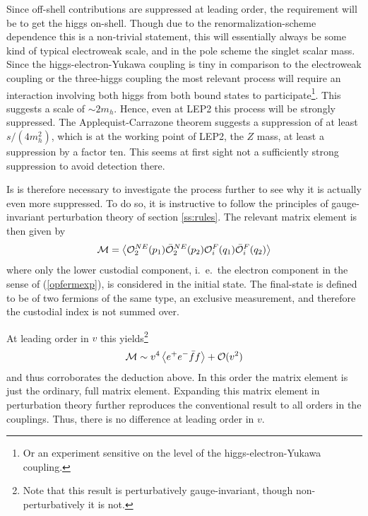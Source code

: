 \documentclass[final,12pt]{article}
\newcommand*{\no}{\noindent}
\newcommand*{\be}{\begin{equation}}
\newcommand*{\ee}{\end{equation}}
\newcommand*{\pref}[1]{(\ref{#1})}
\newcommand*{\1}{1\!\!\!\bot}
\newcommand*{\la}{\left\langle}
\newcommand*{\ra}{\right\rangle}
\newcommand*{\op}{{\cal O}}
\begin{document}
Since off-shell contributions are suppressed at leading order, the requirement will be to get the higgs on-shell. Though due to the renormalization-scheme dependence this is a non-trivial statement, this will essentially always be some kind of typical electroweak scale, and in the pole scheme the singlet scalar mass. Since the higgs-electron-Yukawa coupling is tiny in comparison to the electroweak coupling or the three-higgs coupling \cite{pdg} the most relevant process will require an interaction involving both higgs from both bound states to participate\footnote{Or an experiment sensitive on the level of the higgs-electron-Yukawa coupling.}. This suggests a scale of $\sim2m_h$. Hence, even at LEP2 this process will be strongly suppressed. The Applequist-Carrazone theorem \cite{BeiglboCk:2006lfa} suggests a suppression of at least $s/(4m_h^2)$, which is at the working point of LEP2, the $Z$ mass, at least a suppression by a factor ten. This seems at first sight not a sufficiently strong suppression to avoid detection there.

Is is therefore necessary to investigate the process further to see why it is actually even more suppressed. To do so, it is instructive to follow the principles of gauge-invariant perturbation theory of section \ref{ss:rules}. The relevant matrix element is then given by \cite{Egger:2017tkd}
\be
{\cal M}=\la {\cal O}^{NE}_2(p_1){\bar{\cal O}}^{NE}_2(p_2){\cal O}^F_i(q_1){\bar{\cal O}}^F_i(q_2)\ra\label{eeff}
\ee
\no where only the lower custodial component, i.\ e.\ the electron component in the sense of \pref{opfermexp}, is considered in the initial state. The final-state is defined to be of two fermions of the same type, an exclusive measurement, and therefore the custodial index is not summed over.

At leading order in $v$ this yields\footnote{Note that this result is perturbatively gauge-invariant, though non-perturbatively it is not.}
\be
{\cal M}\sim v^4\la e^+e^-\bar{f}f\ra+\op(v^2)\label{eeffv0}
\ee
\no and thus corroborates the deduction above. In this order the matrix element is just the ordinary, full matrix element. Expanding this matrix element in perturbation theory further reproduces the conventional result \cite{Bohm:2001yx} to all orders in the couplings. Thus, there is no difference at leading order in $v$.
\end{document}

